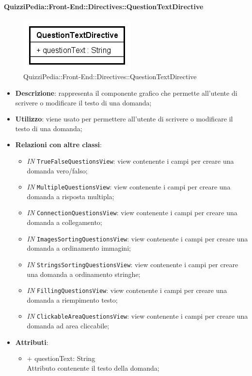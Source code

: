 \paragraph{QuizziPedia::Front-End::Directives::QuestionTextDirective}

\label{QuizziPedia::Front-End::Directives::QuestionTextDirective}

\begin{figure}[ht]
	\centering
	\includegraphics[scale=0.80,keepaspectratio]{UML/Classi/Front-End/QuizziPedia_Front-end_Directives_QuestionTextDirective.png}
	\caption{QuizziPedia::Front-End::Directives::QuestionTextDirective}
\end{figure} 
\FloatBarrier

\begin{itemize}
	\item \textbf{Descrizione}: rappresenta il componente grafico che permette all'utente di scrivere o modificare il testo di una domanda;
	\item \textbf{Utilizzo}: viene usato per permettere all'utente di scrivere o modificare il testo di una domanda;
	\item \textbf{Relazioni con altre classi}: 
	\begin{itemize}
		\item \textit{IN} \texttt{TrueFalseQuestionsView}: view contenente i campi per creare una domanda vero/falso; 
		\item \textit{IN} \texttt{MultipleQuestionsView}: view contenente i campi per creare una domanda a risposta multipla;
		\item \textit{IN} \texttt{ConnectionQuestionsView}: view contenente i campi per creare una domanda a collegamento;
		\item \textit{IN} \texttt{ImagesSortingQuestionsView}: view contenente i campi per creare una domanda a ordinamento immagini;
		\item \textit{IN} \texttt{StringsSortingQuestionsView}: view contenente i campi per creare una domanda a ordinamento stringhe;
		\item \textit{IN} \texttt{FillingQuestionsView}: view contenente i campi per creare una domanda a riempimento testo;
		\item \textit{IN} \texttt{ClickableAreaQuestionsView}: view contenente i campi per creare una domanda ad area cliccabile;
	\end{itemize}
	\item \textbf{Attributi}: 
	\begin{itemize}
		\item {+ questionText: String} \\ Attributo contenente il testo della domanda;
	\end{itemize}
\end{itemize}

